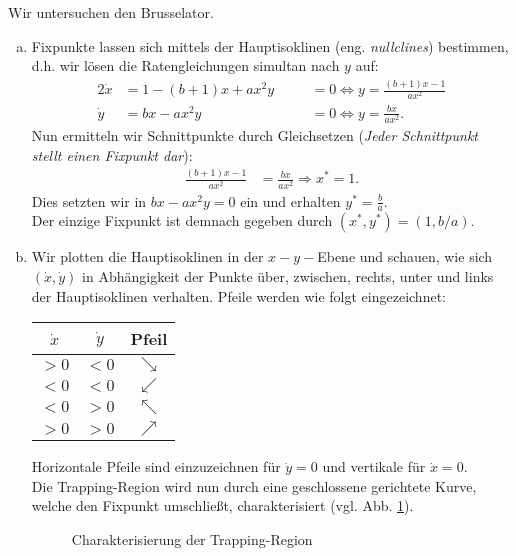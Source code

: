 \documentclass[11pt,a4paper]{article}
\begin{document}
\begin{loes}
Wir untersuchen den Brusselator.
\begin{enumerate}[a)] 
\item Fixpunkte lassen sich mittels der Hauptisoklinen (eng. \emph{nullclines}) bestimmen, d.h. wir l\"osen die Ratengleichungen simultan nach $y$ auf:\begin{alignat*}{2} \dot{x} &= 1 - (b+1)x + ax^2y &\quad &= 0 \iff y = \frac{(b+1)x-1}{ax^2}\\
\dot{y} &= bx - ax^2y &\quad &= 0 \iff y = \frac{bx}{ax^2}.\end{alignat*} Nun ermitteln wir Schnittpunkte durch Gleichsetzen (\emph{Jeder Schnittpunkt stellt einen Fixpunkt dar}): \begin{align*} \frac{(b+1)x-1}{ax^2} &= \frac{bx}{ax^2} \Rightarrow x^* = 1.\end{align*} Dies setzten wir \zB in  $bx -ax^2y = 0$ ein und erhalten $y^* = \tfrac{b}{a}$. \\Der einzige Fixpunkt ist demnach gegeben durch $(x^*,y^*) = (1, b/a).$
\item Wir plotten die Hauptisoklinen in der $x-y-$Ebene und schauen, wie sich $(\dot{x},\dot{y})$ in Abh\"angigkeit der Punkte \"uber, zwischen, rechts, unter und links der Hauptisoklinen verhalten. Pfeile werden  wie folgt eingezeichnet:
\begin{center}
\begin{tabular}{|c|c|c|}\hline
$\dot{x}$ & $\dot{y}$ & Pfeil \\ \hline \hline
$> 0$ & $< 0$ & $\searrow$ \\
$<0$ & $< 0$ & $\swarrow$ \\
$<0$ & $> 0$ & $\nwarrow$ \\
$>0$ & $> 0$ & $\nearrow$ \\\hline
\end{tabular}
\end{center}
Horizontale Pfeile sind einzuzeichnen f\"ur $\dot{y} = 0$ und vertikale f\"ur $\dot{x} = 0.$\\
Die Trapping-Region wird nun durch eine geschlossene gerichtete Kurve, welche den Fixpunkt umschlie\ss t, charakterisiert (vgl. Abb. \ref{fig:trapping}).
\begin {figure}[!h] %
\begin{center}
\caption[Trapping-Region]{Charakterisierung der Trapping-Region}
\label{fig:trapping}    %
\end{center} 

\end{figure}
\end{enumerate}
\end{loes}
\end{document}
